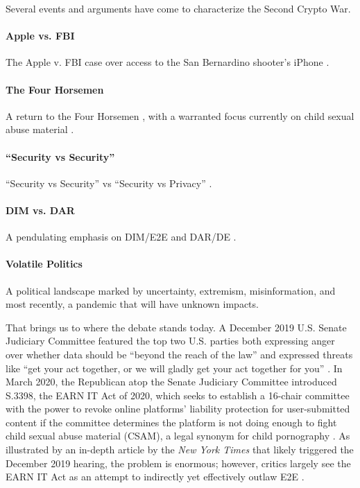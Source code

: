 Several events and arguments have come to characterize the Second Crypto War.

\paragraph*{Apple vs. FBI} The Apple v. FBI case over access to the San Bernardino shooter's iPhone
\cite{schulze_clipper_2017}.

\paragraph*{The Four Horsemen} A return to the Four Horsemen \cite{schneier_scaring_2019}, with a warranted focus
currently on child sexual abuse material \cite{keller_internet_2019} \cite{geller_2019}.

\paragraph*{``Security vs Security''} ``Security vs Security'' vs ``Security vs Privacy''
\cite{stalla_bourdillon_privacy_2014} \cite{schneier_2019}.

\paragraph*{DIM vs. DAR} A pendulating emphasis on DIM/E2E and DAR/DE \cite{schneier_2019}.

\paragraph*{Volatile Politics} A political landscape marked by uncertainty, extremism, misinformation, and most
recently, a pandemic that will have unknown impacts.

That brings us to where the debate stands today. A December 2019 U.S. Senate Judiciary Committee featured the top two
U.S. parties both expressing anger over whether data should be ``beyond the reach of the law'' and expressed threats
like ``get your act together, or we will gladly get your act together for you'' \cite{geller_2019}. In March 2020, the
Republican atop the Senate Judiciary Committee introduced S.3398, the EARN IT Act of 2020, which seeks to establish a
16-chair committee with the power to revoke online platforms' liability protection for user-submitted content if the
committee determines the platform is not doing enough to fight child sexual abuse material (CSAM), a legal synonym for
child pornography \cite{graham_s3398_2020}. As illustrated by an in-depth article by the \textit{New York Times}
\cite{keller_internet_2019} that likely triggered the December 2019 hearing, the problem is enormous; however, critics
largely see the EARN IT Act as an attempt to indirectly yet effectively outlaw E2E \cite{newman_2020}
\cite{pfefferkorn_2020}.

